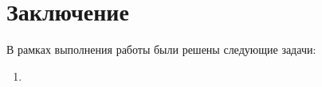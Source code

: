 \chapter*{Заключение}



В рамках выполнения работы были решены следующие задачи:

\begin{enumerate}
	\item 
\end{enumerate}